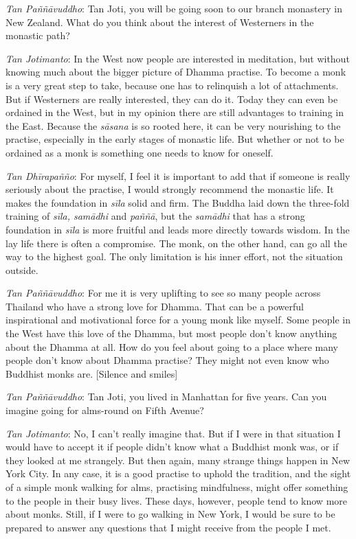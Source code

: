 \emph{Tan Paññāvuddho}: Tan Joti, you will be going soon to our branch
monastery in New Zealand. What do you think about the interest of
Westerners in the monastic path? 

\emph{Tan Jotimanto}: In the West now people are interested in
meditation, but without knowing much about the bigger picture of Dhamma
practise. To become a monk is a very great step to take, because one has
to relinquish a lot of attachments. But if Westerners are really
interested, they can do it. Today they can even be ordained in the West, 
but in my opinion there are still advantages to training in the East. 
Because the \emph{sāsana} is so rooted here, it can be very nourishing
to the practise, especially in the early stages of monastic life. But
whether or not to be ordained as a monk is something one needs to know
for oneself. 

\emph{Tan Dhīrapañño}: For myself, I feel it is important to add that
if someone is really seriously about the practise, I would strongly
recommend the monastic life. It makes the foundation in \emph{sīla}
solid and firm. The Buddha laid down the three-fold training of
\emph{sīla, samādhi} and \emph{paññā}, but the \emph{samādhi} that has a
strong foundation in \emph{sīla} is more fruitful and leads more
directly towards wisdom. In the lay life there is often a compromise. 
The monk, on the other hand, can go all the way to the highest goal. The
only limitation is his inner effort, not the situation outside. 

\emph{Tan Paññāvuddho}: For me it is very uplifting to see so many
people across Thailand who have a strong love for Dhamma. That can be a
powerful inspirational and motivational force for a young monk like
myself. Some people in the West have this love of the Dhamma, but most
people don't know anything about the Dhamma at all. How do you feel
about going to a place where many people don't know about Dhamma
practise? They might not even know who Buddhist monks are. [Silence and smiles]

\emph{Tan Paññāvuddho}: Tan Joti, you lived in Manhattan for five
years. Can you imagine going for alms-round on Fifth Avenue? 

\emph{Tan Jotimanto}: No, I can't really imagine that. But if I were in
that situation I would have to accept it if people didn't know what a
Buddhist monk was, or if they looked at me strangely. But then again, 
many strange things happen in New York City. In any case, it is a good
practise to uphold the tradition, and the sight of a simple monk walking
for alms, practising mindfulness, might offer something to the people in
their busy lives. These days, however, people tend to know more about
monks. Still, if I were to go walking in New York, I would be sure to be
prepared to answer any questions that I might receive from the people I
met. 

